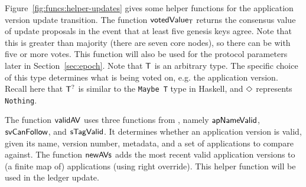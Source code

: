 \clearpage

Figure~\ref{fig:funcs:helper-updates} gives some helper functions for the
application version update transition.
The function $\mathsf{votedValue_T}$ returns
the consensus value of update proposals in the event that at least five
genesis keys agree. Note that this is greater than majority (there are seven
core nodes), so there can
be  with five or more votes.
This function will also be used for the protocol parameters later in Section~\ref{sec:epoch}.
Note that $\mathsf{T}$ is an arbitrary type. The specific choice of this type
determines what is being voted on, e.g. the application version.
Recall here that $\mathsf{T}^?$ is similar to the \texttt{Maybe T} type in Haskell,
and $\Diamond$ represents \texttt{Nothing}.

The function $\mathsf{validAV}$ uses three functions from \cite{byron_ledger_spec}, namely
$\mathsf{apNameValid}$, $\mathsf{svCanFollow}$, and $\mathsf{sTagValid}$. It determines
whether an application version is valid, given its name, version number,
metadata, and a set of applications to compare against.
The function $\mathsf{newAVs}$ adds the most recent valid application
versions to (a finite map of) applications (using right override).
This helper function will be used in the ledger update.

